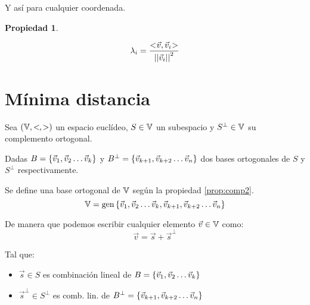 \documentclass[a5paper,12pt,twoside]{book}
\newtheorem{prop}{{Propiedad}}[chapter]
\begin{document}
Y así para cualquier coordenada.

\begin{mdframed}[style=PropertyFrame]
    \begin{prop}
        \label{prop:orto3}
    \end{prop}
    \begin{equation*}
        \lambda_i = \frac{<\hspace{-0.8mm}\Vec{v},\Vec{v}_i\hspace{-0.8mm}>}{{\left|\left| {\Vec{v}_i} \right|\right|}^2}
    \end{equation*}
\end{mdframed}


\section{Mínima distancia}

Sea $(\mathbb{V}, <\hspace{-0.8mm}\,,\,\hspace{-0.8mm}>)$ un espacio euclídeo, $S\in\mathbb{V}$ un subespacio y $S^\perp\in\mathbb{V}$ su complemento ortogonal.

Dadas $B={ \left\{ {\Vec{v}_1 , \Vec{v}_2 \dots \Vec{v}_k} \right\} }$ y $B^\perp = { \left\{ {\Vec{v}_{k+1} , \Vec{v}_{k+2} \dots \Vec{v}_n} \right\} }$ dos bases ortogonales de $S$ y $S^\perp$ respectivamente.

Se define una base ortogonal de $\mathbb{V}$ según la propiedad \ref{prop:comp2}.
\begin{equation*}
    \mathbb{V} = \operatorname{gen} { \left\{ {\Vec{v}_1 , \Vec{v}_2 \dots \Vec{v}_k , \Vec{v}_{k+1} , \Vec{v}_{k+2} \dots \Vec{v}_n} \right\} }
\end{equation*}

De manera que podemos escribir cualquier elemento $\Vec{v}\in\mathbb{V}$ como:
\begin{equation*}
    \Vec{v} = \Vec{s} + \Vec{s}^\perp
\end{equation*}

Tal que:
\begin{itemize}
    \item 
    $\Vec{s} \in S$ es combinación lineal de $B={ \left\{ {\Vec{v}_1 , \Vec{v}_2 \dots \Vec{v}_k} \right\} }$
    
    \item
    $\Vec{s}^\perp \in S^\perp$ es comb. lin. de $B^\perp = { \left\{ {\Vec{v}_{k+1} , \Vec{v}_{k+2} \dots \Vec{v}_n} \right\} }$
\end{itemize}
\end{document}
